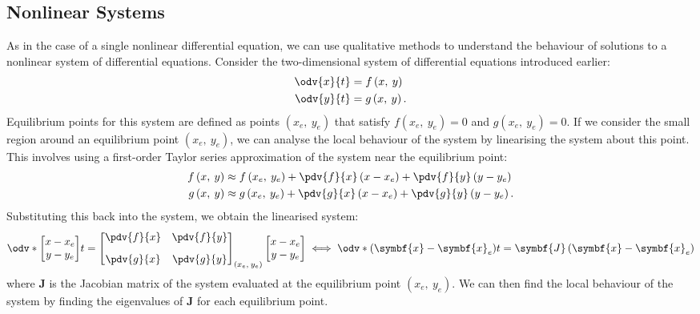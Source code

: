 \documentclass{article}
\begin{document}
\subsection{Nonlinear Systems}
As in the case of a single nonlinear differential equation, we can use
qualitative methods to understand the behaviour of solutions to a
nonlinear system of differential equations. Consider the
two-dimensional system of differential equations introduced earlier:
\begin{align*}
    \odv{x}{t} & = f\left( x,\: y \right)  \\
    \odv{y}{t} & = g\left( x,\: y \right).
\end{align*}
Equilibrium points for this system are defined as points \(\left( x_e,\: y_e \right)\)
that satisfy \(f\left( x_e,\: y_e \right) = 0\) and \(g\left( x_e,\: y_e \right) = 0\).
If we consider the small region around an equilibrium point
\(\left( x_e,\: y_e \right)\), we can analyse the local behaviour of
the system by linearising the system about this point. This involves
using a first-order Taylor series approximation of the system near the
equilibrium point:
\begin{align*}
    f\left( x,\: y \right) & \approx f\left( x_e,\: y_e \right) + \pdv{f}{x}\left( x - x_e \right) + \pdv{f}{y}\left( y - y_e \right)  \\
    g\left( x,\: y \right) & \approx g\left( x_e,\: y_e \right) + \pdv{g}{x}\left( x - x_e \right) + \pdv{g}{y}\left( y - y_e \right).
\end{align*}
Substituting this back into the system, we obtain the linearised system:
\begin{equation*}
    \odv*{
        \begin{bmatrix}
            x - x_e \\
            y - y_e
        \end{bmatrix}
    }{t} =
    \begin{bmatrix}
        \displaystyle \pdv{f}{x} & \displaystyle \pdv{f}{y} \\[2ex]
        \displaystyle \pdv{g}{x} & \displaystyle \pdv{g}{y}
    \end{bmatrix}
    _{\left( x_e,\: y_e \right)}
    \begin{bmatrix}
        x - x_e \\
        y - y_e
    \end{bmatrix}
    \iff \odv*{\left( \symbf{x} - \symbf{x}_e \right)}{t} = \symbf{J} \left( \symbf{x} - \symbf{x}_e \right)
\end{equation*}
where \(\symbf{J}\) is the Jacobian matrix of the system evaluated at
the equilibrium point \(\left( x_e,\: y_e \right)\). We can then find
the local behaviour of the system by finding the eigenvalues of
\(\symbf{J}\) for each equilibrium point.
\end{document}
